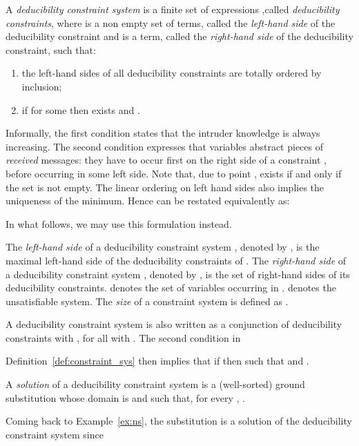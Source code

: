 \documentclass[acmtocl,acmnow]{acmtrans2m}
\newcommand{\dedcons}[1]{deducibility constraint}
\newcommand{\dedsys}[1]{deducibility constraint system}
\newcommand{\dedconss}[1]{deducibility constraints}
\begin{document}
\begin{definition}\label{def:constraint_sys}
A \emph{\dedsys{}}  is a finite set of expressions
,\linebreak called \emph{\dedconss{}}, where  is a non empty set of terms, called the \emph{left-hand
side} of the \dedcons{} and
 is a term, called the \emph{right-hand side} of the \dedcons{}, such that:
\begin{enumerate}
\item\label{def-item:cs1} the left-hand sides of all \dedconss{} are totally ordered by inclusion;
\item\label{def-item:cs2} if  for some  then  exists and .
\end{enumerate}
\end{definition}

Informally, the first condition states that the intruder knowledge is
always increasing. The second condition expresses that variables abstract
pieces of \emph{received} messages: they have to occur first on the right
side of a constraint , before occurring in some left side.  
Note that, due to point ,  exists if and only if the set
 is not empty. 
The linear ordering on left hand sides also implies the uniqueness of the
minimum. Hence  can be restated equivalently as:

In what follows, we may use this formulation instead.





The \emph{left-hand side} of a \dedsys{} , denoted by ,
is the maximal left-hand side of the \dedconss{} of .
The \emph{right-hand side} of a \dedsys{}
, denoted by , is the set of right-hand sides of its
\dedconss{}.  denotes the set of variables occurring in
.  denotes the unsatisfiable system. The \emph{size} of a
constraint system is defined as .


A \dedsys{}  is also written as a conjunction of \dedconss{}  with , for all  with . The second condition in

Definition~\ref{def:constraint_sys} then implies that if  then  such that 
and .




\begin{definition}
A \emph{solution}  of a \dedsys{}  is a (well-sorted) ground substitution whose domain is  and such that, for every , .
\end{definition}

\begin{example}
Coming back to Example~\ref{ex:ns}, the substitution 
  is a solution of the \dedsys{} since

\end{example}
\end{document}

